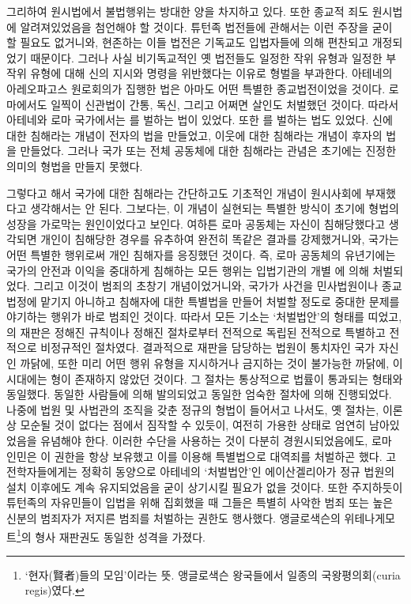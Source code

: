 그리하여 원시법에서 불법행위는 방대한 양을 차지하고 있다.
또한 종교적 죄도 원시법에 알려져있었음을 첨언해야 할 것이다.
튜턴족 법전들에 관해서는 이런 주장을 굳이 할 필요도 없거니와,
현존하는 이들 법전은 기독교도 입법자들에 의해
편찬되고 개정되었기 때문이다.
그러나 사실 비기독교적인 옛 법전들도
일정한 작위 유형과 일정한 부작위 유형에 대해
신의 지시와 명령을 위반했다는 이유로 형벌을 부과한다.
아테네의 아레오파고스 원로회의가 집행한 법은
아마도 어떤 특별한 종교법전이었을 것이다.
로마에서도 일찍이
신관법이
간통, 독신, 그리고 어쩌면 살인도
처벌했던 것이다.
따라서 아테네와 로마 국가에서는 를 벌하는 법이 있었다.
또한 를 벌하는 법도 있었다.
신에 대한 침해라는 개념이 전자의 법을 만들었고,
이웃에 대한 침해라는 개념이 후자의 법을 만들었다.
그러나 국가 또는 전체 공동체에 대한 침해라는 관념은
초기에는 진정한 의미의 형법을 만들지 못했다.

그렇다고 해서
국가에 대한 침해라는 간단하고도 기초적인 개념이 원시사회에
부재했다고 생각해서는 안 된다.
그보다는,
이 개념이 실현되는 특별한 방식이
초기에 형법의 성장을 가로막는 원인이었다고 보인다.
여하튼
로마 공동체는 자신이 침해당했다고 생각되면
개인이 침해당한 경우를 유추하여
완전히 똑같은 결과를 강제했거니와,
국가는 어떤 특별한 행위로써 개인 침해자를 응징했던 것이다.
즉, 로마 공동체의 유년기에는
국가의 안전과 이익을 중대하게 침해하는 모든 행위는
입법기관의 개별 에 의해 처벌되었다.
그리고 이것이 범죄의 초창기 개념이었거니와,
국가가 사건을 민사법원이나 종교법정에 맡기지 아니하고
침해자에 대한 특별법을 만들어 처벌할 정도로
중대한 문제를 야기하는 행위가
바로 범죄인 것이다.
따라서 모든 기소는
`처벌법안'의
형태를 띠었고,
의 재판은
정해진 규칙이나 정해진 절차로부터 전적으로 독립된
전적으로 특별하고 전적으로 비정규적인 절차였다.
결과적으로
재판을 담당하는 법원이 통치자인 국가 자신인 까닭에,
또한
미리 어떤 행위 유형을 지시하거나 금지하는 것이 불가능한 까닭에,
이 시대에는 형이 존재하지 않았던 것이다.
그 절차는 통상적으로 법률이 통과되는 형태와 동일했다.
동일한 사람들에 의해 발의되었고
동일한 엄숙한 절차에 의해 진행되었다.
나중에 법원 및 사법관의 조직을 갖춘 정규의 형법이
들어서고 나서도,
옛 절차는,
이론상 모순될 것이 없다는 점에서 짐작할 수 있듯이,
여전히
가용한 상태로
엄연히
남아있었음을 유념해야 한다.
이러한 수단을 사용하는 것이 다분히 경원시되었음에도,
로마 인민은
이 권한을 항상 보유했고 이를 이용해
특별법으로 대역죄를 처벌하곤 했다.
고전학자들에게는
정확히 동양으로
아테네의 `처벌법안'인
에이산겔리아가
정규 법원의 설치 이후에도 계속 유지되었음을 굳이 상기시킬 필요가 없을 것이다.
또한
주지하듯이
튜턴족의 자유민들이 입법을 위해 집회했을 때
그들은
특별히 사악한 범죄
또는
높은 신분의 범죄자가 저지른 범죄를 처벌하는 권한도 행사했다.
앵글로색슨의 위테나게모트\footnote{%
  `현자(賢者)들의 모임'이라는 뜻. 앵글로색슨 왕국들에서
  일종의 국왕평의회(curia regis)였다.
}의 형사 재판권도
동일한 성격을 가졌다.

